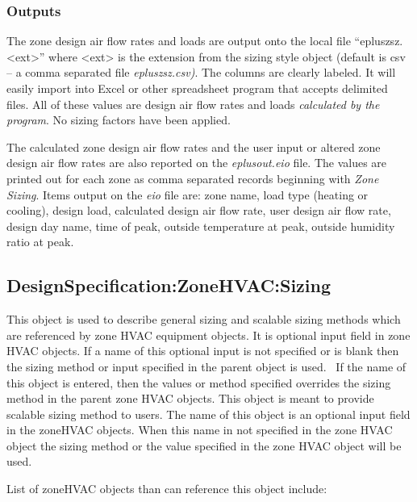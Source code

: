 \subsubsection{Outputs}\label{outputs-1-007}

The zone design air flow rates and loads are output onto the local file ``epluszsz.\textless{}ext\textgreater{}'' where \textless{}ext\textgreater{} is the extension from the sizing style object (default is csv -- a comma separated file \emph{epluszsz.csv)}. The columns are clearly labeled. It will easily import into Excel or other spreadsheet program that accepts delimited files. All of these values are design air flow rates and loads \emph{calculated by the program}. No sizing factors have been applied.

The calculated zone design air flow rates and the user input or altered zone design air flow rates are also reported on the \emph{eplusout.eio} file. The values are printed out for each zone as comma separated records beginning with \emph{Zone Sizing}. Items output on the \emph{eio} file are: zone name, load type (heating or cooling), design load, calculated design air flow rate, user design air flow rate, design day name, time of peak, outside temperature at peak, outside humidity ratio at peak.

\subsection{DesignSpecification:ZoneHVAC:Sizing}\label{designspecificationzonehvacsizing}

This object is used to describe general sizing and scalable sizing methods which are referenced by zone HVAC equipment objects. It is optional input field in zone HVAC objects. If a name of this optional input is not specified or is blank then the sizing method or input specified in the parent object is used.~ If the name of this object is entered, then the values or method specified overrides the sizing method in the parent zone HVAC objects. This object is meant to provide scalable sizing method to users. The name of this object is an optional input field in the zoneHVAC objects. When this name in not specified in the zone HVAC object the sizing method or the value specified in the zone HVAC object will be used.

List of zoneHVAC objects than can reference this object include:

